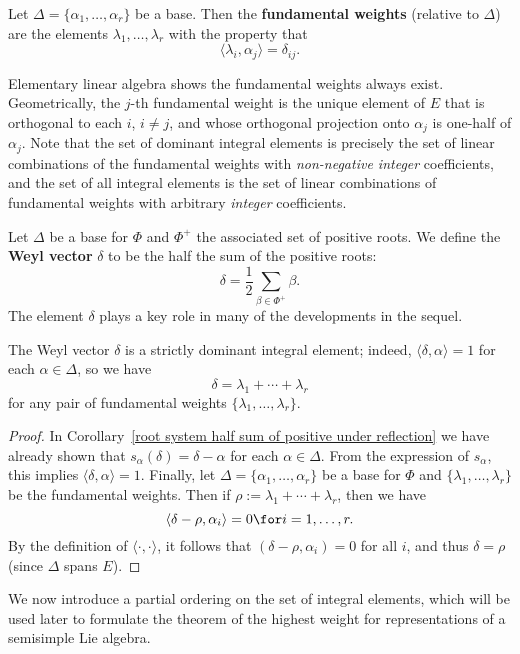 \begin{definition}
Let $\Delta=\{\alpha_1,\dots,\alpha_r\}$ be a base. Then the \textbf{fundamental weights} (relative to $\Delta$) are the elements $\lambda_1,\dots,\lambda_r$ with the property that
\[\langle\lambda_i,\alpha_j\rangle=\delta_{ij}.\]
\end{definition}
Elementary linear algebra shows the fundamental weights always exist. Geometrically, the $j$-th fundamental weight is the unique element of $E$ that is orthogonal to each $i$, $i\neq j$, and whose orthogonal projection onto $\alpha_j$ is one-half of $\alpha_j$. Note that the set of dominant integral elements is precisely the set of linear combinations of the fundamental weights with \textit{non-negative integer} coefficients, and the set of all integral elements is the set of linear combinations of fundamental weights with arbitrary \textit{integer} coefficients.
\begin{definition}
Let $\Delta$ be a base for $\Phi$ and $\Phi^+$ the associated set of positive roots. We define the \textbf{Weyl vector} $\delta$ to be the half the sum of the positive roots:
\[\delta=\frac{1}{2}\sum_{\beta\in\Phi^+}\beta.\]
The element $\delta$ plays a key role in many of the developments in the sequel.
\end{definition}
\begin{lemma}\label{root system half sum of positive is integral}
The Weyl vector $\delta$ is a strictly dominant integral element; indeed, $\langle\delta,\alpha\rangle=1$ for each $\alpha\in\Delta$, so we have
\[\delta=\lambda_1+\cdots+\lambda_r\]
for any pair of fundamental weights $\{\lambda_1,\dots,\lambda_r\}$.
\end{lemma}
\begin{proof}
In Corollary~\ref{root system half sum of positive under reflection} we have already shown that $s_\alpha(\delta)=\delta-\alpha$ for each $\alpha\in\Delta$. From the expression of $s_\alpha$, this implies $\langle\delta,\alpha\rangle=1$. Finally, let $\Delta=\{\alpha_1,\dots,\alpha_r\}$ be a base for $\Phi$ and $\{\lambda_1,\dots,\lambda_r\}$ be the fundamental weights. Then if $\rho:=\lambda_1+\cdots+\lambda_r$, then we have
\[\langle\delta-\rho,\alpha_i\rangle=0\for i=1,\dots,r.\]
By the definition of $\langle\cdot,\cdot\rangle$, it follows that $(\delta-\rho,\alpha_i)=0$ for all $i$, and thus $\delta=\rho$ (since $\Delta$ spans $E$).
\end{proof}
We now introduce a partial ordering on the set of integral elements, which will be used later to formulate the theorem of the highest weight for representations of a semisimple Lie algebra.
